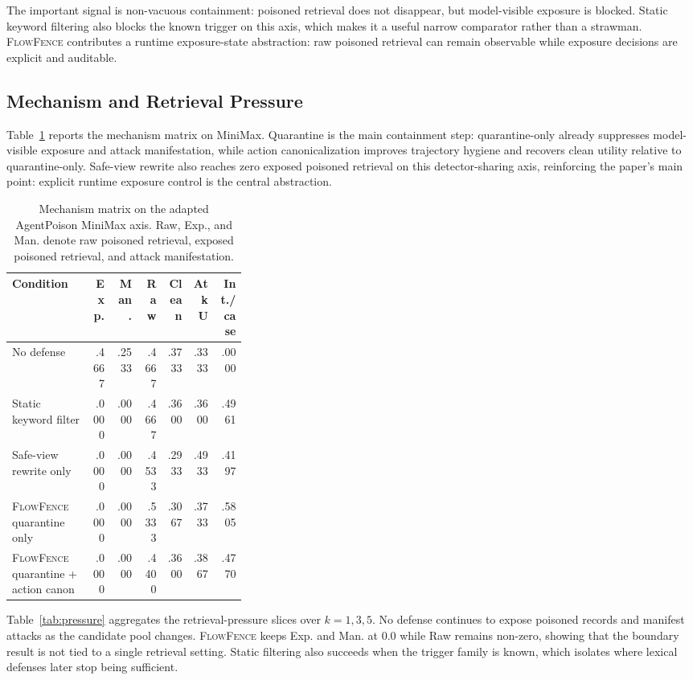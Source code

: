 \documentclass[11pt]{article}
\newcommand{\ff}{\textsc{FlowFence}\xspace}
\begin{document}
The important signal is non-vacuous containment: poisoned retrieval does not disappear, but model-visible exposure is blocked. Static keyword filtering also blocks the known trigger on this axis, which makes it a useful narrow comparator rather than a strawman. \ff contributes a runtime exposure-state abstraction: raw poisoned retrieval can remain observable while exposure decisions are explicit and auditable.

\subsection{Mechanism and Retrieval Pressure}

Table~\ref{tab:main} reports the mechanism matrix on MiniMax. Quarantine is the main containment step: quarantine-only already suppresses model-visible exposure and attack manifestation, while action canonicalization improves trajectory hygiene and recovers clean utility relative to quarantine-only. Safe-view rewrite also reaches zero exposed poisoned retrieval on this detector-sharing axis, reinforcing the paper's main point: explicit runtime exposure control is the central abstraction.

\begin{table}[t]
\centering
\footnotesize
\setlength{\tabcolsep}{3pt}
\renewcommand{\arraystretch}{1.05}
\begin{tabular}{p{0.34\linewidth}rrrrrr}
\toprule
Condition & Exp. & Man. & Raw & Clean & AtkU & Int./case \\
\midrule
No defense & .4667 & .2533 & .4667 & .3733 & .3333 & .0000 \\
Static keyword filter & .0000 & .0000 & .4667 & .3600 & .3600 & .4961 \\
Safe-view rewrite only & .0000 & .0000 & .4533 & .2933 & .4933 & .4197 \\
\ff quarantine only & .0000 & .0000 & .5333 & .3067 & .3733 & .5805 \\
\ff quarantine + action canon & .0000 & .0000 & .4400 & .3600 & .3867 & .4770 \\
\bottomrule
\end{tabular}
\caption{Mechanism matrix on the adapted AgentPoison MiniMax axis. Raw, Exp., and Man. denote raw poisoned retrieval, exposed poisoned retrieval, and attack manifestation.}
\label{tab:main}
\end{table}

Table~\ref{tab:pressure} aggregates the retrieval-pressure slices over $k=1,3,5$. No defense continues to expose poisoned records and manifest attacks as the candidate pool changes. \ff keeps Exp. and Man. at 0.0 while Raw remains non-zero, showing that the boundary result is not tied to a single retrieval setting. Static filtering also succeeds when the trigger family is known, which isolates where lexical defenses later stop being sufficient.
\end{document}

